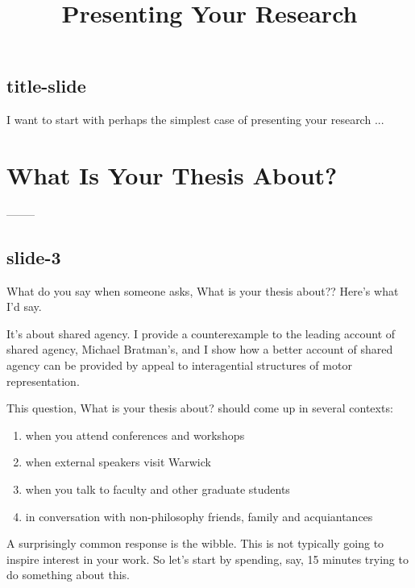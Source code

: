\documentclass[12pt,\papersize]{extarticle}
\begin{document}
\setlength\footnotesep{1em}







      
\title {Presenting Your Research}
 
 
 
\maketitle
 
\subsection{title-slide}
I want to start with perhaps the simplest case of presenting your research ...
 
 
 
\section{What Is Your Thesis About?}
 
--------
\subsection{slide-3}
What do you say when someone asks, What is your thesis about??
Here's what I'd say.
 
It's about shared agency.  I provide a counterexample to the leading account of shared agency,
Michael Bratman's, and I show how a better account of shared agency can be provided by appeal to 
interagential structures of motor representation.
 
This question, What is your thesis about? should come up in several contexts:
\begin{enumerate}
\item when you attend conferences and workshops
\item when external speakers visit Warwick
\item when you talk to faculty and other graduate students
\item in conversation with non-philosophy friends, family and acquiantances
\end{enumerate}
 
A surprisingly common response is the wibble.
This is not typically going to inspire interest in your work.
So let's start by spending, say, 15 minutes trying to do something about this.
 
\end{document}
